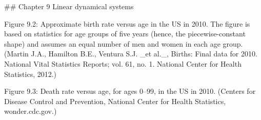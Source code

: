 

## Chapter 9 Linear dynamical systems

Figure 9.2: Approximate birth rate versus age in the US in 2010. The figure is based on statistics for age groups of five years (hence, the piecewise-constant shape) and assumes an equal number of men and women in each age group. (Martin J.A., Hamilton B.E., Ventura S.J. _et al._, Births: Final data for 2010. National Vital Statistics Reports; vol. 61, no. 1. National Center for Health Statistics, 2012.)

Figure 9.3: Death rate versus age, for ages 0–99, in the US in 2010. (Centers for Disease Control and Prevention, National Center for Health Statistics, wonder.cdc.gov.)